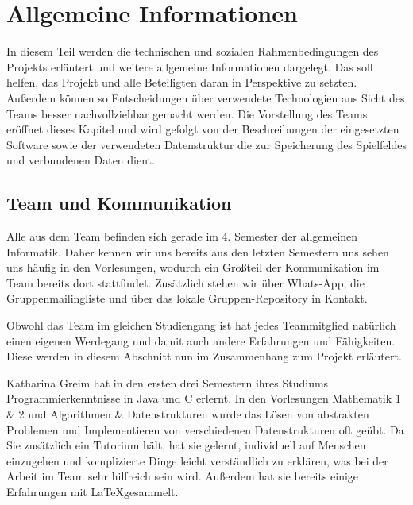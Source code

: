 \documentclass[12pt,a4paper,bibliography=totocnumbered,listof=totocnumbered]{scrartcl}
\begin{document}
    \section{Allgemeine Informationen}
    \vspace{1em}

    In diesem Teil werden die technischen und sozialen Rahmenbedingungen des Projekts erläutert und weitere allgemeine Informationen dargelegt. Das soll helfen, das Projekt und alle Beteiligten daran in Perspektive zu setzten. Außerdem können so Entscheidungen über verwendete Technologien aus Sicht des Teams besser nachvollziehbar gemacht werden. Die Vorstellung des Teams eröffnet dieses Kapitel und wird gefolgt von der Beschreibungen der eingesetzten Software sowie der verwendeten Datenstruktur die zur Speicherung des Spielfeldes und verbundenen Daten dient.

    \subsection{Team und Kommunikation}
    \vspace{1em}
    Alle aus dem Team befinden sich gerade im 4. Semester der allgemeinen Informatik. Daher kennen wir uns bereits aus den letzten Semestern uns sehen uns häufig in den Vorlesungen, wodurch ein Großteil der Kommunikation im Team bereits dort stattfindet. Zusätzlich stehen wir über Whats-App, die Gruppenmailingliste und über das lokale Gruppen-Repository in Kontakt.

    Obwohl das Team im gleichen Studiengang ist hat jedes Teammitglied natürlich einen eigenen Werdegang und damit auch andere Erfahrungen und Fähigkeiten. Diese werden in diesem Abschnitt nun im Zusammenhang zum Projekt erläutert.

    Katharina Greim hat in den ersten drei Semestern ihres Studiums Programmierkenntnisse in Java und C erlernt. In den Vorlesungen Mathematik 1 \& 2 und Algorithmen \& Datenstrukturen wurde das Lösen von abstrakten Problemen und Implementieren von verschiedenen Datenstrukturen oft geübt. Da Sie zusätzlich ein Tutorium hält, hat sie gelernt, individuell auf Menschen einzugehen und komplizierte Dinge leicht verständlich zu erklären, was bei der Arbeit im Team sehr hilfreich sein wird. Außerdem hat sie bereits einige Erfahrungen mit \LaTeX\quad gesammelt.
\end{document}
